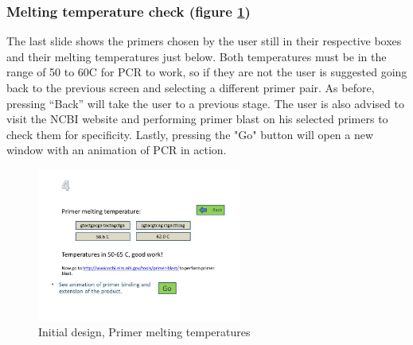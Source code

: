 \subsubsection{Melting temperature check (figure \ref{fig:UiDes:slide6})}
The last slide shows the primers chosen by the user still in their
respective boxes and their melting temperatures just below.
Both temperatures must be in the range of 50 to 60\degree C for
PCR to work, so if they are not the user is suggested going back to
the previous screen and selecting a different primer pair.
As before, pressing ``Back'' will take the user to a previous stage.
The user is also advised to visit the NCBI website \cite{ncbi} and
performing primer blast on his selected primers to check them for
specificity. Lastly, pressing the "Go" button will open a new window
with an animation of PCR in action.

\begin{figure}[h]
  \begin{center}
	\includegraphics[width=0.6\textwidth]{./images/UiDes/Slide6.JPG}
    \caption{
      \label{fig:UiDes:slide6}
      Initial design, Primer melting temperatures
    }
  \end{center}
\end{figure}

